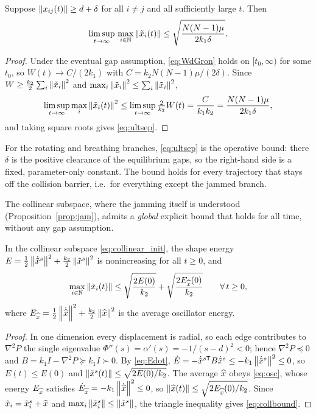 \begin{corollary}\label{cor:ultimate}
Suppose $\left\| x_{ij}(t) \right\|\ge d+\delta$ for all $i\ne j$ and all sufficiently large $t$. Then
\begin{equation}
  \limsup_{t\to\infty}\,\max_{i\in\mathbb{N}}\left\| \tilde{x}_i(t) \right\|
  \le \sqrt{\frac{N(N-1)\mu}{2k_1\delta}} .
  \label{eq:ultsep}
\end{equation}
\end{corollary}

\begin{proof}
Under the eventual gap assumption, \eqref{eq:WdGron} holds on $[t_0,\infty)$ for some $t_0$, so
$W(t)\to C/(2k_1)$ with $C=k_2N(N-1)\mu/(2\delta)$. Since $W\ge\frac{k_2}{2}\sum_i\left\| \tilde{x}_i \right\|^2$
and $\max_i\left\| \tilde{x}_i \right\|^2\le\sum_i\left\| \tilde{x}_i \right\|^2$,
\begin{equation}
  \limsup_{t\to\infty}\max_i\left\| \tilde{x}_i(t) \right\|^2
  \le\limsup_{t\to\infty}\tfrac{2}{k_2}W(t)
  =\frac{C}{k_1k_2}=\frac{N(N-1)\mu}{2k_1\delta} ,
\end{equation}
and taking square roots gives \eqref{eq:ultsep}.
\end{proof}

For the rotating and breathing branches, \eqref{eq:ultsep} is the operative bound: there $\delta$ is
the positive clearance of the equilibrium gaps, so the right-hand side is a fixed, parameter-only
constant. The bound holds for every trajectory that stays off the collision barrier, i.e.\ for
everything except the jammed branch.

The collinear subspace, where the jamming itself is understood (Proposition~\ref{prop:jam}), admits a
\emph{global} explicit bound that holds for all time, without any gap assumption.

\begin{proposition}\label{prop:collinear_bound}
In the collinear subspace \eqref{eq:collinear_init}, the shape energy
$E=\tfrac12\left\| \dot{\tilde{x}}^s \right\|^2+\tfrac{k_2}{2}\left\| \tilde{x}^s \right\|^2$ is nonincreasing for all $t\ge0$, and
\begin{equation}
  \max_{i\in\mathbb{N}}\left\| \tilde{x}_i(t) \right\|
  \le \sqrt{\frac{2E(0)}{k_2}}+\sqrt{\frac{2E_{\widehat{x}}(0)}{k_2}}
  \qquad\forall\,t\ge0,
  \label{eq:collbound}
\end{equation}
where $E_{\widehat{x}}=\tfrac12\left\| \dot{\widehat{x}} \right\|^2+\tfrac{k_2}{2}\left\| \widehat{x} \right\|^2$ is the average oscillator energy.
\end{proposition}

\begin{proof}
In one dimension every displacement is radial, so each edge contributes to $\nabla^2P$ the single
eigenvalue $\Phi''(s)=\alpha'(s)=-1/(s-d)^2<0$; hence $\nabla^2P\preceq0$ and
$B=k_1I-\nabla^2P\succeq k_1I\succ0$. By \eqref{eq:Edot},
$\dot E=-\dot{\tilde{x}}^{s\mathsf T}B\dot{\tilde{x}}^s\le-k_1\left\| \dot{\tilde{x}}^s \right\|^2\le0$, so
$E(t)\le E(0)$ and $\left\| \tilde{x}^s(t) \right\|\le\sqrt{2E(0)/k_2}$. The average $\widehat{x}$ obeys \eqref{eq:osc},
whose energy $E_{\widehat{x}}$ satisfies $\dot E_{\widehat{x}}=-k_1\left\| \dot{\widehat{x}} \right\|^2\le0$, so
$\left\| \widehat{x}(t) \right\|\le\sqrt{2E_{\widehat{x}}(0)/k_2}$. Since $\tilde{x}_i=\tilde{x}_i^s+\widehat{x}$ and
$\max_i\left\| \tilde{x}_i^s \right\|\le\left\| \tilde{x}^s \right\|$, the triangle inequality gives \eqref{eq:collbound}.
\end{proof}

